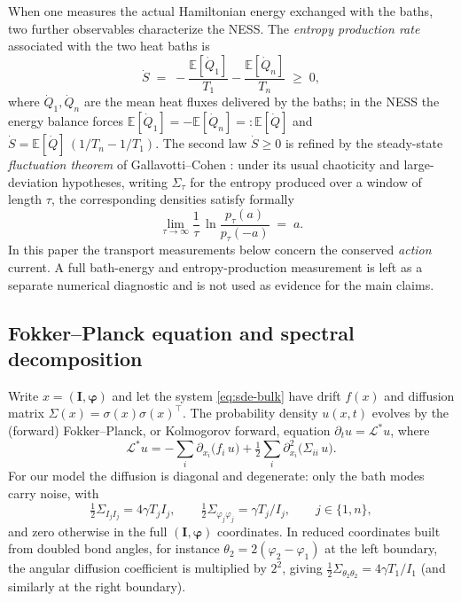 \documentclass[11pt,a4paper]{article}
\theoremstyle{definition}
\newcommand{\E}{\mathbb{E}}
\numberwithin{equation}{section}   %
\newcommand{\bI}{\mathbf{I}}
\newcommand{\bphi}{\boldsymbol{\varphi}}
\newcommand{\Ladj}{\mathcal{L}^{*}}
\begin{document}
When one measures the actual Hamiltonian energy exchanged with the baths, two
further observables characterize the NESS. The \emph{entropy production rate}
associated with the two heat baths is
\begin{equation}\label{eq:entropy-prod}
  \dot S \;=\; -\frac{\E[\dot Q_1]}{T_1} - \frac{\E[\dot Q_n]}{T_n} \;\ge\; 0,
\end{equation}
where $\dot Q_1,\dot Q_n$ are the mean heat fluxes delivered by the baths; in
the NESS the energy balance forces $\E[\dot Q_1]=-\E[\dot Q_n]=:\E[\dot Q]$ and
$\dot S = \E[\dot Q]\,(1/T_n - 1/T_1)$. The second law $\dot S\ge 0$ is refined
by the steady-state \emph{fluctuation theorem} of Gallavotti--Cohen
\cite{GallavottiCohen}: under its usual chaoticity and large-deviation
hypotheses, writing $\Sigma_\tau$ for the entropy produced over a window of
length $\tau$, the corresponding densities satisfy formally
\begin{equation}\label{eq:ft}
  \lim_{\tau\to\infty}\frac{1}{\tau}\,
  \ln\frac{p_\tau(a)}{p_\tau(-a)} \;=\; a .
\end{equation}
In this paper the transport measurements below concern the conserved
\emph{action} current. A full bath-energy and entropy-production measurement is
left as a separate numerical diagnostic and is not used as evidence for the main claims.

\subsection{Fokker--Planck equation and spectral decomposition}\label{sec:fp}

Write $x=(\bI,\bphi)$ and let the system \eqref{eq:sde-bulk} have drift $f(x)$
and diffusion matrix $\Sigma(x)=\sigma(x)\sigma(x)^{\!\top}$. The probability
density $u(x,t)$ evolves by the (forward) Fokker--Planck, or Kolmogorov forward,
equation $\partial_t u = \Ladj u$, where
\begin{equation}\label{eq:fp-operator}
  \Ladj u = -\sum_i \partial_{x_i}\!\big(f_i\,u\big)
            + \tfrac12\sum_{i} \partial^{2}_{x_i}\!\big(\Sigma_{ii}\,u\big).
\end{equation}
For our model the diffusion is diagonal and degenerate: only the bath modes
carry noise, with
\begin{equation}\label{eq:diffusion}
  \tfrac12\Sigma_{I_j I_j} = 4\gamma T_j I_j, \qquad
  \tfrac12\Sigma_{\varphi_j\varphi_j} = \gamma T_j/I_j,
  \qquad j\in\{1,n\},
\end{equation}
and zero otherwise in the full $(\bI,\bphi)$ coordinates. In reduced
coordinates built from doubled bond angles, for instance
$\theta_2=2(\varphi_2-\varphi_1)$ at the left boundary, the angular diffusion
coefficient is multiplied by $2^2$, giving
$\tfrac12\Sigma_{\theta_2\theta_2}=4\gamma T_1/I_1$ (and similarly at the right
boundary).
\end{document}
